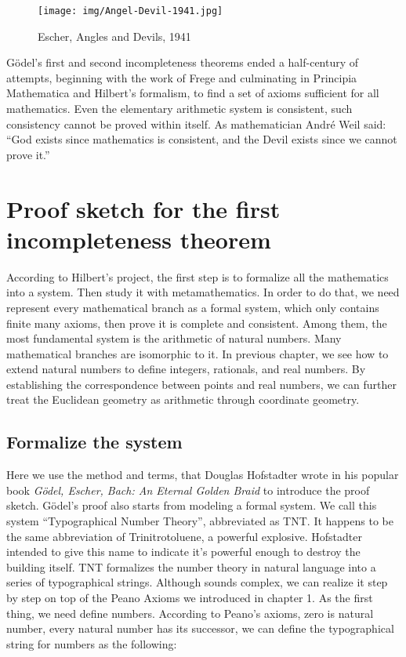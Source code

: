 \documentclass[b5paper]{article}
\begin{document}
\begin{figure}[htbp]
 \centering
 \texttt{[image: img/Angel-Devil-1941.jpg]}
 \caption{Escher, Angles and Devils, 1941}
 \label{fig:Angel-Devil-1941}
\end{figure}

Gödel's first and second incompleteness theorems ended a half-century of attempts, beginning with the work of Frege and culminating in Principia Mathematica and Hilbert's formalism, to find a set of axioms sufficient for all mathematics. Even the elementary arithmetic system is consistent, such consistency cannot be proved within itself. As mathematician André Weil said: ``God exists since mathematics is consistent, and the Devil exists since we cannot prove it.''\cite{HanXueTao16}

\section{Proof sketch for the first incompleteness theorem}

According to Hilbert's project, the first step is to formalize all the mathematics into a system. Then study it with metamathematics. In order to do that, we need represent every mathematical branch as a formal system, which only contains finite many axioms, then prove it is complete and consistent. Among them, the most fundamental system is the arithmetic of natural numbers. Many mathematical branches are isomorphic to it. In previous chapter, we see how to extend natural numbers to define integers, rationals, and real numbers. By establishing the correspondence between points and real numbers, we can further treat the Euclidean geometry as arithmetic through coordinate geometry.

\subsection{Formalize the system}
 
Here we use the method and terms, that Douglas Hofstadter wrote in his popular book {\em Gödel, Escher, Bach: An Eternal Golden Braid} to introduce the proof sketch. Gödel's proof also starts from modeling a formal system. We call this system ``Typographical Number Theory'', abbreviated as TNT. It happens to be the same abbreviation of Trinitrotoluene, a powerful explosive. Hofstadter intended to give this name to indicate it's powerful enough to destroy the building itself. TNT formalizes the number theory in natural language into a series of typographical strings. Although sounds complex, we can realize it step by step on top of the Peano Axioms we introduced in chapter 1. As the first thing, we need define numbers. According to Peano's axioms, zero is natural number, every natural number has its successor, we can define the typographical string for numbers as the following:
\end{document}
